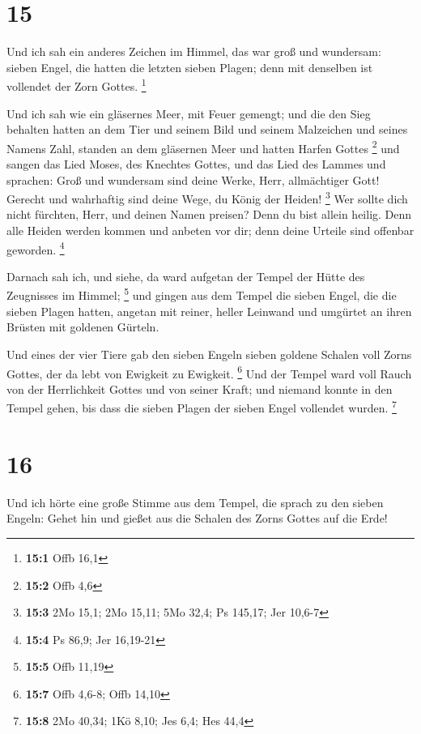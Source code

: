 \hypertarget{section-4}{%
\section{15}\label{section-4}}

 Und ich sah ein anderes Zeichen im Himmel, das war groß und
wundersam: sieben Engel, die hatten die letzten sieben Plagen; denn mit
denselben ist vollendet der Zorn Gottes. \footnote{\textbf{15:1} Offb
  16,1}

 Und ich sah wie ein gläsernes Meer, mit Feuer gemengt; und
die den Sieg behalten hatten an dem Tier und seinem Bild und seinem
Malzeichen und seines Namens Zahl, standen an dem gläsernen Meer und
hatten Harfen Gottes \footnote{\textbf{15:2} Offb 4,6}  und
sangen das Lied Moses, des Knechtes Gottes, und das Lied des Lammes und
sprachen: Groß und wundersam sind deine Werke, Herr, allmächtiger Gott!
Gerecht und wahrhaftig sind deine Wege, du König der Heiden! \footnote{\textbf{15:3}
  2Mo 15,1; 2Mo 15,11; 5Mo 32,4; Ps 145,17; Jer 10,6-7}  Wer
sollte dich nicht fürchten, Herr, und deinen Namen preisen? Denn du bist
allein heilig. Denn alle Heiden werden kommen und anbeten vor dir; denn
deine Urteile sind offenbar geworden. \footnote{\textbf{15:4} Ps 86,9;
  Jer 16,19-21}

 Darnach sah ich, und siehe, da ward aufgetan der Tempel der
Hütte des Zeugnisses im Himmel; \footnote{\textbf{15:5} Offb 11,19}
 und gingen aus dem Tempel die sieben Engel, die die sieben
Plagen hatten, angetan mit reiner, heller Leinwand und umgürtet an ihren
Brüsten mit goldenen Gürteln.

 Und eines der vier Tiere gab den sieben Engeln sieben
goldene Schalen voll Zorns Gottes, der da lebt von Ewigkeit zu Ewigkeit.
\footnote{\textbf{15:7} Offb 4,6-8; Offb 14,10}  Und der
Tempel ward voll Rauch von der Herrlichkeit Gottes und von seiner Kraft;
und niemand konnte in den Tempel gehen, bis dass die sieben Plagen der
sieben Engel vollendet wurden. \footnote{\textbf{15:8} 2Mo 40,34; 1Kö
  8,10; Jes 6,4; Hes 44,4}

\hypertarget{section-5}{%
\section{16}\label{section-5}}

 Und ich hörte eine große Stimme aus dem Tempel, die sprach
zu den sieben Engeln: Gehet hin und gießet aus die Schalen des Zorns
Gottes auf die Erde!

